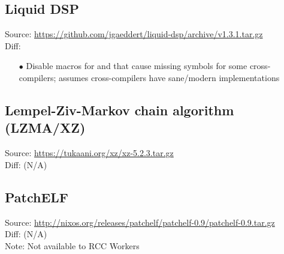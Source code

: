 \begin{appendices}
\subsection{Liquid DSP}
Source: \url{https://github.com/jgaeddert/liquid-dsp/archive/v1.3.1.tar.gz}\\
Diff: 
\label{App:liquid}
\begin{enumerate}
\item[$\bullet$] Disable  macros for  and  that cause missing  symbols for some cross-compilers; assumes cross-compilers have sane/modern  implementations
\end{enumerate}

\subsection{Lempel-Ziv-Markov chain algorithm (LZMA/XZ)}
Source: \url{https://tukaani.org/xz/xz-5.2.3.tar.gz}\\
Diff: (N/A)
\label{App:xz}

\subsection{PatchELF}
Source: \url{http://nixos.org/releases/patchelf/patchelf-0.9/patchelf-0.9.tar.gz}\\
Diff: (N/A)\\
Note: Not available to RCC Workers
\label{App:patchelf}

\end{appendices}
\fi

